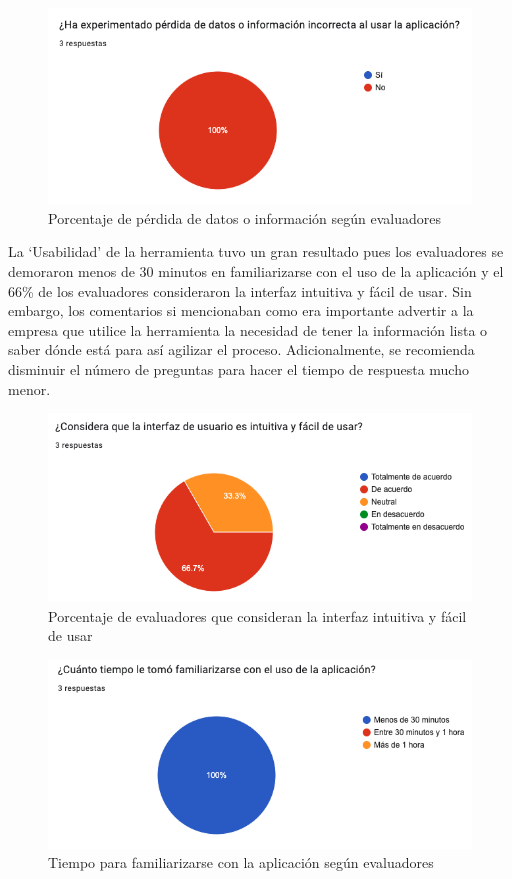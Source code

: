 \begin{figure}[H]
        \centering
        \includegraphics[scale=0.45]{images/6-validacion/2-confiabilidad.png}
        \caption{Porcentaje de pérdida de datos o información según evaluadores}
\end{figure}

La ‘Usabilidad’ de la herramienta tuvo un gran resultado pues los evaluadores se demoraron menos de 30 minutos en familiarizarse con el uso de la aplicación y el 66\% de los evaluadores consideraron la interfaz intuitiva y fácil de usar. Sin embargo, los comentarios si mencionaban como era importante advertir a la empresa que utilice la herramienta la necesidad de tener la información lista o saber dónde está para así agilizar el proceso.  Adicionalmente, se recomienda disminuir el número de preguntas para hacer el tiempo de respuesta mucho menor.

\begin{figure}[H]
        \centering
        \includegraphics[scale=0.45]{images/6-validacion/3-usabilidad.png}
        \caption{Porcentaje de evaluadores que consideran la interfaz intuitiva y fácil de usar}
\end{figure}

\begin{figure}[H]
        \centering
        \includegraphics[scale=0.45]{images/6-validacion/4-usabilidad.png}
        \caption{Tiempo para familiarizarse con la aplicación según evaluadores}
\end{figure}
    
